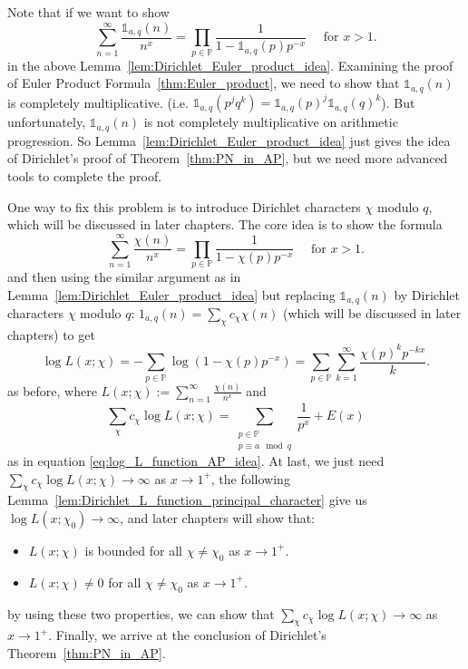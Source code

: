\documentclass{elegantbook}
\begin{document}
\begin{note}
  Note that if we want to show
  \[
    \sum_{n=1}^{\infty} \frac{\mathds{1}_{a,q}(n)}{n^x} = \prod_{p\in \mathbb{P}} \frac{1}{1 - \mathds{1}_{a,q}(p) p^{-x}} \quad \text{ for } x > 1.
  \]
  in the above Lemma~\ref{lem:Dirichlet_Euler_product_idea}. Examining the proof of Euler Product Formula~\ref{thm:Euler_product}, we need to show that $\mathds{1}_{a,q}(n)$ is completely multiplicative. (i.e. $\mathds{1}_{a,q}(p^jq^k) = \mathds{1}_{a,q}(p)^j\mathds{1}_{a,q}(q)^k$). But unfortunately, $\mathds{1}_{a,q}(n)$ is not completely multiplicative on arithmetic progression. So Lemma~\ref{lem:Dirichlet_Euler_product_idea} just gives the idea of Dirichlet's proof of Theorem~\ref{thm:PN_in_AP}, but we need more advanced tools to complete the proof.

  One way to fix this problem is to introduce Dirichlet characters $\chi$ modulo $q$, which will be discussed in later chapters. The core idea is to show the formula
  \[
    \sum_{n=1}^{\infty} \frac{\chi(n)}{n^x} = \prod_{p\in \mathbb{P}} \frac{1}{1 - \chi(p) p^{-x}} \quad \text{ for } x > 1.
  \]
  and then using the similar argument as in Lemma~\ref{lem:Dirichlet_Euler_product_idea} but replacing $\mathds{1}_{a,q}(n)$ by Dirichlet characters $\chi$ modulo $q$: $1_{a,q}(n)=\sum_{\chi} c_{\chi} \chi(n)$ (which will be discussed in later chapters) to get
  \[
    \log L(x;\chi) = -\sum_{p \in \mathbb{P}} \log(1 - \chi(p) p^{-x}) = \sum_{p \in \mathbb{P}} \sum_{k=1}^{\infty} \frac{\chi(p)^k p^{-kx}}{k}.
  \]
  as before, where $L(x;\chi):= \sum_{n=1}^{\infty} \frac{\chi(n)}{n^x}$ and
  \[
    \sum_{\chi} c_{\chi} \log L(x;\chi) = \sum_{\substack{p \in \mathbb{P} \\ p \equiv a \mod q}} \frac{1}{p^x} + E(x)
  \]
  as in equation \eqref{eq:log_L_function_AP_idea}. At last, we just need $\sum_{\chi} c_{\chi} \log L(x;\chi) \to \infty$ as $x \to 1^+$, the following Lemma~\ref{lem:Dirichlet_L_function_principal_character} give us $\log L(x;\chi_0) \to \infty$, and later chapters will show that:
  \begin{itemize}
    \item $L(x;\chi)$ is bounded for all $\chi \ne \chi_0$ as $x \to 1^+$.
    \item $L(x;\chi)\ne0$ for all $\chi\ne \chi_0$ as $x \to 1^+$.
  \end{itemize}
  by using these two properties, we can show that $\sum_{\chi} c_{\chi} \log L(x;\chi) \to \infty$ as $x \to 1^+$. Finally, we arrive at the conclusion of Dirichlet's Theorem~\ref{thm:PN_in_AP}.
\end{note}
\end{document}
